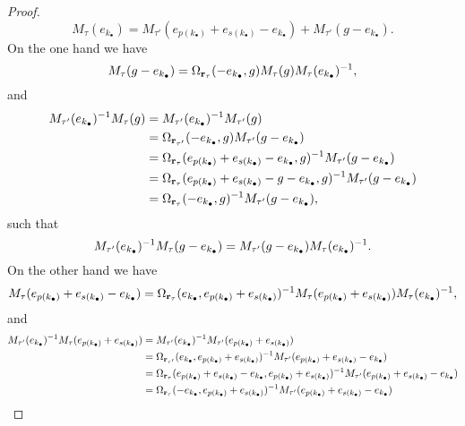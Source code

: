\begin{proof}
	\begin{equation*}
		M_{\tau}(e_{k_\bullet}) = M_{\tau'}(e_{p(k_\bullet)}+e_{s(k_\bullet)}-e_{k_\bullet}) + M_{\tau'}(g-e_{k_\bullet}).
	\end{equation*}
	On the one hand we have
	\begin{equation*}
		M_\tau(g - e_{k_\bullet}) = \Omega_{\mathbf{r}_\tau}(-e_{k_\bullet}, g) M_\tau(g) M_\tau(e_{k_\bullet})^{-1},
	\end{equation*}
	and
	\begin{align*}
		M_{\tau'}(e_{k_\bullet})^{-1} M_\tau(g)
		 & = M_{\tau'}(e_{k_\bullet})^{-1} M_{\tau'}(g)                                                                        \\
		 & =  \Omega_{\mathbf{r}_{\tau'}}(-e_{k_\bullet}, g)M_{\tau'}(g -e_{k_\bullet})                                             \\
		 & =  \Omega_{\mathbf{r}_{\tau}}(e_{p(k_\bullet)} + e_{s(k_\bullet)} -e_{k_\bullet}, g)^{-1} M_{\tau'}(g -e_{k_\bullet})     \\
		 & =  \Omega_{\mathbf{r}_{\tau}}(e_{p(k_\bullet)} + e_{s(k_\bullet)} - g -e_{k_\bullet}, g)^{-1} M_{\tau'}(g -e_{k_\bullet}) \\
		 & =  \Omega_{\mathbf{r}_{\tau}}(-e_{k_\bullet}, g)^{-1} M_{\tau'}(g -e_{k_\bullet}),
	\end{align*}
	such that
	\begin{equation*}
		M_{\tau'}(e_{k_\bullet})^{-1} M_\tau(g -e_{k_\bullet}) = M_{\tau'}(g - e_{k_\bullet})M_\tau (e_{k_\bullet})^{-1}.
	\end{equation*}
	On the other hand we have
	\begin{equation*}
		M_\tau(e_{p(k_\bullet)} + e_{s(k_\bullet)} - e_{k_\bullet}) = \Omega_{\mathbf{r}_\tau}( e_{k_\bullet}, e_{p(k_\bullet)} + e_{s(k_\bullet)})^{-1}  M_\tau(e_{p(k_\bullet)} + e_{s(k_\bullet)}) M_\tau (e_{k_\bullet})^{-1},
	\end{equation*}
	and
	\begin{align*}
		M_{\tau'}(\ekbullet)\inv M_\tau(\epsbullet)
		 & = M_{\tau'}(\ekbullet)\inv M_{\tau'}(\epsbullet)                                               \\
		 & = \Omega_{\bbr_{\tau'}}(\ekbullet, \epsbullet)\inv M_{\tau'}(\epsbullet - \ekbullet)           \\
		 & = \Omega_{\bbr_{\tau}}(\epsbullet-\ekbullet, \epsbullet)\inv M_{\tau'}(\epsbullet - \ekbullet) \\
		 & = \Omega_{\bbr_{\tau}}(-\ekbullet, \epsbullet)\inv M_{\tau'}(\epsbullet - \ekbullet)           \\

\end{align*}
\end{proof}
